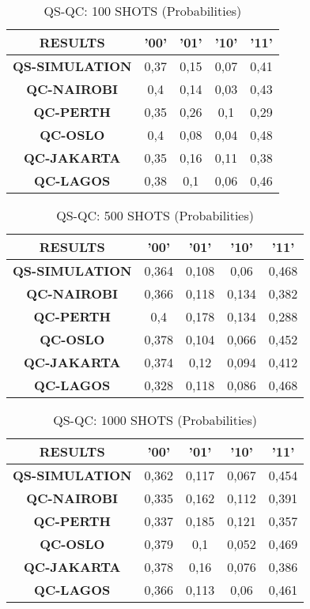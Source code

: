 \begin{table}[!ht]
    \centering
    \begin{tabular}{ccccc}
    \hline
        \textbf{RESULTS} & \textbf{'00'} & \textbf{'01'} & \textbf{'10'} & \textbf{'11' } \\ \hline
        \textbf{QS-SIMULATION} & 0,37 & 0,15 & 0,07 & 0,41  \\ 
        \textbf{QC-NAIROBI} & 0,4 & 0,14 & 0,03 & 0,43  \\ 
        \textbf{QC-PERTH} & 0,35 & 0,26 & 0,1 & 0,29  \\ 
        \textbf{QC-OSLO} & 0,4 & 0,08 & 0,04 & 0,48  \\ 
        \textbf{QC-JAKARTA} & 0,35 & 0,16 & 0,11 & 0,38  \\ 
        \textbf{QC-LAGOS} & 0,38 & 0,1 & 0,06 & 0,46 \\ \hline
    \end{tabular}
    \caption{QS-QC: 100 SHOTS (Probabilities)}
\end{table}

\begin{table}[!ht]
    \centering
    \begin{tabular}{ccccc}
    \hline
        \textbf{RESULTS} & \textbf{'00'} & \textbf{'01'} & \textbf{'10'} & \textbf{'11' } \\ \hline
        \textbf{QS-SIMULATION} & 0,364 & 0,108 & 0,06 & 0,468  \\ 
        \textbf{QC-NAIROBI} & 0,366 & 0,118 & 0,134 & 0,382  \\ 
        \textbf{QC-PERTH} & 0,4 & 0,178 & 0,134 & 0,288  \\ 
        \textbf{QC-OSLO} & 0,378 & 0,104 & 0,066 & 0,452  \\ 
        \textbf{QC-JAKARTA} & 0,374 & 0,12 & 0,094 & 0,412  \\ 
        \textbf{QC-LAGOS} & 0,328 & 0,118 & 0,086 & 0,468 \\ \hline
    \end{tabular}
    \caption{QS-QC: 500 SHOTS (Probabilities)}
\end{table}


\begin{table}[!ht]
    \centering
    \begin{tabular}{ccccc}
    \hline
        \textbf{RESULTS} & \textbf{'00'} & \textbf{'01'} & \textbf{'10'} & \textbf{'11' } \\ \hline
        \textbf{QS-SIMULATION} & 0,362 & 0,117 & 0,067 & 0,454  \\ 
        \textbf{QC-NAIROBI} & 0,335 & 0,162 & 0,112 & 0,391  \\ 
        \textbf{QC-PERTH} & 0,337 & 0,185 & 0,121 & 0,357  \\ 
        \textbf{QC-OSLO} & 0,379 & 0,1 & 0,052 & 0,469  \\ 
        \textbf{QC-JAKARTA} & 0,378 & 0,16 & 0,076 & 0,386  \\ 
        \textbf{QC-LAGOS} & 0,366 & 0,113 & 0,06 & 0,461 \\ \hline
    \end{tabular}
    \caption{QS-QC: 1000 SHOTS (Probabilities)}
\end{table}

